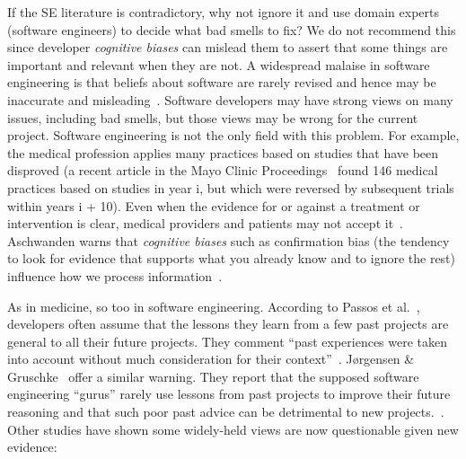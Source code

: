 \documentclass[twocolumn,5p]{elsarticle}
\theoremstyle{break}
\begin{document}
	If the SE literature is contradictory, why not ignore it and use domain experts (software engineers) to decide
	what bad smells to fix? We do not recommend this since developer {\em cognitive biases} can mislead them to
	assert that some things are important and relevant when they are not. 
	A widespread malaise in software engineering is that
	beliefs about software are rarely revised and hence may be
	inaccurate and 
	misleading~\cite{passos11,jorgensen09,mei15,me16phase,prem16}. Software developers may have strong views on many issues, including bad smells, but those views may be wrong for the current
	project.
	Software engineering is not the only field with this problem.
	For example, the medical profession applies many practices based on studies that have been disproved (a recent article in the Mayo Clinic Proceedings~\cite{prasad13} found 146 medical practices based on studies in year i, but which were reversed by subsequent trials within years i + 10). Even when the evidence for or against a treatment or intervention is clear, medical providers and patients may not accept it~\cite{aschwanden10}. Aschwanden warns that {\em cognitive biases} such as confirmation bias (the tendency to look for evidence that supports what you already know and to ignore the rest) influence how we process information~\cite{aschwanden15}.
	
	As in medicine, so too in software engineering.
	According to Passos et al.~\cite{passos11},  developers often  assume that the lessons they learn from a few past projects are general to all their future projects. They comment ``past experiences were taken into account without much consideration for their context''~\cite{passos11}.  J{\o}rgensen \& Gruschke~\cite{jorgensen09} offer a similar warning. They report that the supposed software engineering ``gurus'' rarely use lessons from past projects to improve their future reasoning and that such poor past advice can be detrimental to new projects.~\cite{jorgensen09}. Other studies have shown some widely-held views are   now questionable given new evidence:
	
\end{document}
